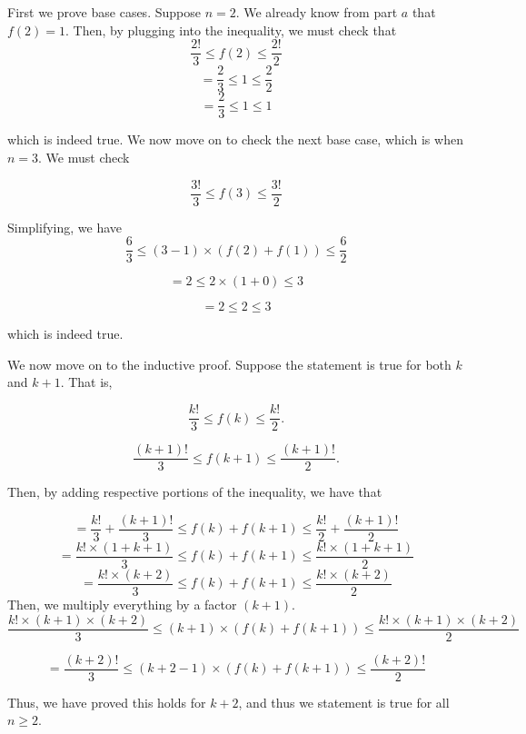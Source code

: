 \documentclass[11pt]{article}
\begin{document}
\begin{enumerate}
\begin{enumerate}
 First we prove base cases. Suppose $n=2$. We already know from part $a$ that $f(2) = 1$. Then, by plugging into the inequality, we must check that 
$$
\frac{2!}{3} \leq f(2) \leq \frac{2!}{2}
$$
$$
 = \frac{2}{3} \leq 1 \leq \frac{2}{2}
$$
$$
 = \frac{2}{3} \leq 1 \leq 1
$$

which is indeed true. We now move on to check the next base case, which is when $n=3$. We must check

$$
\frac{3!}{3} \leq f(3) \leq \frac{3!}{2}
$$

Simplifying, we have 
$$
\frac{6}{3} \leq (3-1) \times \left( f(2) + f(1) \right) \leq \frac{6}{2}
$$

$$
= 2 \leq 2 \times (1 + 0) \leq 3
$$

$$
= 2 \leq 2 \leq 3
$$

which is indeed true. 

We now move on to the inductive proof. Suppose the statement is true for both $k$ and $k+1$. That is, 

 $$\frac{k!}{3} \leq f(k) \leq \frac{k!}{2}.$$
 
 $$\frac{(k+1)!}{3} \leq f(k+1) \leq \frac{(k+1)!}{2}.$$
 
 Then, by adding respective portions of the inequality, we have that 
 
 $$
= \frac{k!}{3} + \frac{(k+1)!}{3} \leq f(k) + f(k+1) \leq \frac{k!}{2} + \frac{(k+1)!}{2}
 $$
 $$
= \frac{k! \times (1 + k + 1)}{3} \leq f(k) + f(k+1) \leq \frac{k! \times (1 + k + 1)}{2}
 $$
 $$
= \frac{k! \times (k+2)}{3} \leq f(k) + f(k+1) \leq \frac{k! \times (k+2)}{2}
 $$
 Then, we multiply everything by a factor $(k+1)$. 
 $$
\frac{k! \times (k+1) \times (k+2)}{3} \leq (k+1) \times \left(f(k) + f(k+1)\right) \leq \frac{k! \times (k+1) \times (k+2)}{2}
 $$
 
$$
 = \frac{(k+2)!}{3} \leq (k + 2 - 1) \times  \left(f(k) + f(k+1)\right) \leq \frac{(k+2)!}{2}
$$

Thus, we have proved this holds for $k+2$, and thus we statement is true for all $n \geq 2$.
 
 
 
 \end{enumerate}

\end{enumerate}
\end{document}
